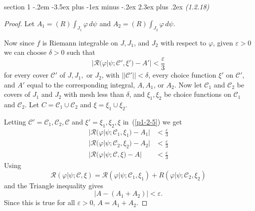\documentclass[12pt]{article}
\makeatletter
\theoremstyle{norm}
\providecommand{\cal}[1]{\mathcal{#1}}
\renewcommand{\cal}[1]{\mathcal{#1}}
\newcommand{\de}[0]{\delta}
\newcommand{\ep}[0]{\varepsilon}
\newcommand{\ept}[0]{\frac{\varepsilon}{3}}
\newcommand{\ph}[0]{\varphi}
\newenvironment{problem}{\@startsection
       {section}
       {1}
       {-.2em}
       {-3.5ex plus -1ex minus -.2ex}
       {2.3ex plus .2ex}
       {\pagebreak[3]%
       \large\bf\noindent{Problem }
       }
       }
       {%
       }
\makeatother
\begin{document}
\begin{problem}{\it (1.2.18)}
\begin{proof}
Let $A_1=(R)\int_{J_1} \ph\,d\psi$ and $A_2=(R)\int_{J_2}\ph\,d\psi$.

Now since $f$ is Riemann integrable on $J,J_1$, and $J_2$ with respect to $\ph$, given $\ep>0$ we can choose $\de>0$ such that
\begin{equation}\label{p1-2-5}
|\cal R(\ph|\psi; \cal C',\xi')-A'|<\ept
\end{equation}
for every cover $\cal C'$ of $J, J_1, $ or $J_2$, with $||\cal C'||<\de$, every choice function $\xi'$ on $\cal C'$, and $A'$ equal to the corresponding integral, $A, A_1$, or $A_2$. Now let $\cal C_1$ and $\cal C_2$ be covers of $J_1$ and $J_2$ with mesh less than $\de$, and $\xi_1,\xi_2$ be choice functions on $\cal C_1$ and $\cal C_2$. Let $C=\cal C_1\cup \cal C_2$ and $\xi=\xi_1\cup \xi_2$.

Letting $\cal C'=\cal C_1,\cal C_2,\cal C$ and $\xi'=\xi_1,\xi_2,\xi$ in~(\ref{p1-2-5}) we get
\begin{align*}
|\cal R(\ph|\psi; \cal C_1,\xi_1)-A_1|&<\ept\\
|\cal R(\ph|\psi; \cal C_2,\xi_2)-A_2|&<\ept\\
|\cal R(\ph|\psi; \cal C,\xi)-A|&<\ept
\end{align*}
Using 
\[
\cal R(\ph|\psi; \cal C,\xi)=\cal R(\ph|\psi; \cal C_1,\xi_1)+R(\ph|\psi; \cal C_2,\xi_2)
\]
and the Triangle inequality gives
\[
|A-(A_1+A_2)|<\ep.
\]
Since this is true for all $\ep>0$, $A=A_1+A_2$. 
\end{proof}
\end{problem}
\end{document}
